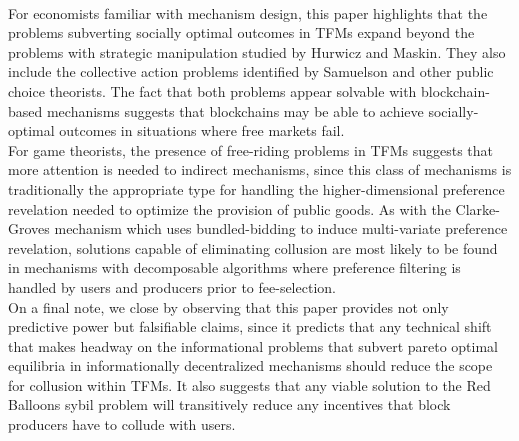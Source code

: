 \documentclass[11pt,a4paper]{llncs}
\begin{document}
\vspace{0.2cm} \\
For economists familiar with mechanism design, this paper highlights that the problems subverting socially optimal outcomes in TFMs expand beyond the problems with strategic manipulation studied by Hurwicz and Maskin. They also include the collective action problems identified by Samuelson and other public choice theorists. The fact that both problems appear solvable with blockchain-based mechanisms suggests that blockchains may be able to achieve socially-optimal outcomes in situations where free markets fail.
\vspace{0.2cm} \\
For game theorists, the presence of free-riding problems in TFMs suggests that more attention is needed to indirect mechanisms, since this class of mechanisms is traditionally the appropriate type for handling the higher-dimensional preference revelation needed to optimize the provision of public goods. As with the Clarke-Groves mechanism which uses bundled-bidding to induce multi-variate preference revelation, solutions capable of eliminating collusion are most likely to be found in mechanisms with decomposable algorithms where preference filtering is handled by users and producers prior to fee-selection.
\vspace{0.2cm} \\
On a final note, we close by observing that this paper provides not only predictive power but falsifiable claims, since it predicts that any technical shift that makes headway on the informational problems that subvert pareto optimal equilibria in informationally decentralized mechanisms should reduce the scope for collusion within TFMs. It also suggests that any viable solution to the Red Balloons sybil problem will transitively reduce any incentives that block producers have to collude with users.
\end{document}

